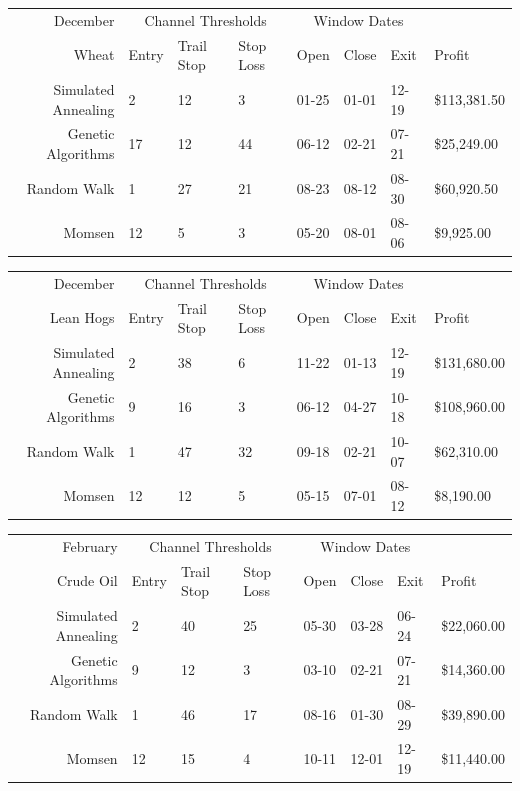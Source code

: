 \documentclass[12pt]{article}
\begin{document}
\begin{tabular}{|r|l|l|l|l|l|l|l|}
  \hline
  December & \multicolumn{3}{|c|}{Channel Thresholds} & \multicolumn{3}{|c|}{Window Dates} &  \\
  Wheat & Entry & Trail Stop & Stop Loss & Open & Close & Exit & Profit\\ \hline
  Simulated Annealing & 2 & 12 & 3 & 01-25 & 01-01 & 12-19 & \$113,381.50 \\ \hline
  Genetic Algorithms & 17 & 12 & 44 & 06-12 & 02-21 & 07-21 & \$25,249.00 \\ \hline
  Random Walk & 1 & 27 & 21 & 08-23 & 08-12 & 08-30 & \$60,920.50 \\ \hline
  Momsen & 12 & 5 & 3 & 05-20 & 08-01 & 08-06 & \$9,925.00 \\ \hline
\end{tabular}

\begin{tabular}{|r|l|l|l|l|l|l|l|}
  \hline
  December  & \multicolumn{3}{|c|}{Channel Thresholds} & \multicolumn{3}{|c|}{Window Dates} &  \\
  Lean Hogs & Entry & Trail Stop & Stop Loss & Open & Close & Exit & Profit\\ \hline
  Simulated Annealing & 2 & 38 & 6 & 11-22 & 01-13 & 12-19 & \$131,680.00 \\ \hline
  Genetic Algorithms & 9 & 16 & 3 & 06-12 & 04-27 & 10-18 & \$108,960.00 \\ \hline
  Random Walk & 1 & 47 & 32 & 09-18 & 02-21 & 10-07 & \$62,310.00 \\ \hline
  Momsen & 12 & 12 & 5 & 05-15 & 07-01 & 08-12 & \$8,190.00 \\ \hline
\end{tabular}

\begin{tabular}{|r|l|l|l|l|l|l|l|}
  \hline
  February & \multicolumn{3}{|c|}{Channel Thresholds} & \multicolumn{3}{|c|}{Window Dates} &  \\
  Crude Oil & Entry & Trail Stop & Stop Loss & Open & Close & Exit & Profit\\ \hline
  Simulated Annealing & 2 & 40 & 25 & 05-30 & 03-28 & 06-24 & \$22,060.00 \\ \hline
  Genetic Algorithms & 9 & 12 & 3 & 03-10 & 02-21 & 07-21 & \$14,360.00 \\ \hline
  Random Walk & 1 & 46 & 17 & 08-16 & 01-30 & 08-29 & \$39,890.00 \\ \hline
  Momsen & 12 & 15 & 4 & 10-11 & 12-01 & 12-19 & \$11,440.00 \\ \hline
\end{tabular}
\end{document}
